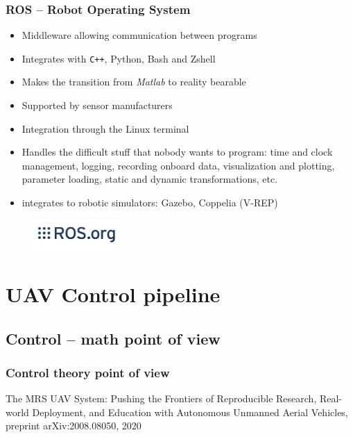 \documentclass[aspectratio=1610]{beamer}
\begin{document}
  \begin{frame}
    \frametitle{ROS -- Robot Operating System}

    \begin{itemize}
      \item Middleware allowing communication between programs
      \item Integrates with \texttt{C++}, Python, Bash and Zshell
      \item Makes the transition from \emph{Matlab} to reality bearable
      \item Supported by sensor manufacturers
      \item Integration through the Linux terminal
      \item Handles the difficult stuff that nobody wants to program: time and clock management, logging, recording onboard data, visualization and plotting, parameter loading, static and dynamic transformations, etc.
      \item integrates to robotic simulators: Gazebo, Coppelia (V-REP)
    \end{itemize}

    \begin{figure}
      \includegraphics[width=0.3\textwidth]{./fig/ros_logo.jpg}
    \end{figure}

  \end{frame}



  \section{UAV Control pipeline}
  \subsection{Control -- math point of view}

  \begin{frame}
    \frametitle{Control theory point of view}

    \begin{figure}
      \begin{adjustbox}{max totalsize={1.0\textwidth}{.85\textheight}, center}
        
      \end{adjustbox}
    \end{figure}

    \begin{block}{\cite{baca2020mrs}}
      The MRS UAV System: Pushing the Frontiers of Reproducible Research, Real-world Deployment, and Education with Autonomous Unmanned Aerial Vehicles, preprint arXiv:2008.08050, 2020
    \end{block}

  \end{frame}
\end{document}
